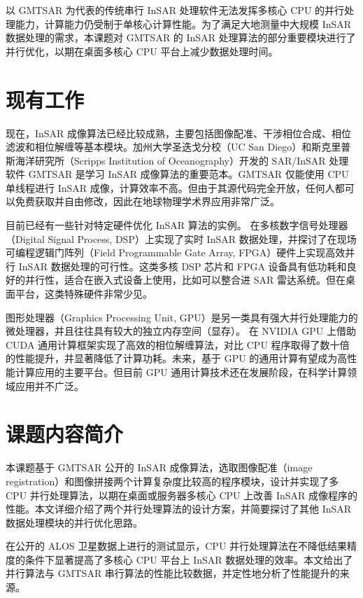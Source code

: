 以 GMTSAR 为代表的传统串行 InSAR 处理软件无法发挥多核心 CPU 的并行处理能力，计算能力仍受制于单核心计算性能。为了满足大地测量中大规模 InSAR 数据处理的需求，本课题对 GMTSAR 的 InSAR 处理算法的部分重要模块进行了并行优化，以期在桌面多核心 CPU 平台上减少数据处理时间。

\section{现有工作}

现在，InSAR 成像算法已经比较成熟，主要包括图像配准、干涉相位合成、相位滤波和相位解缠等基本模块。加州大学圣迭戈分校（UC San Diego）和斯克里普斯海洋研究所（Scripps Institution of Oceanography）开发的 SAR/InSAR 处理软件 GMTSAR 是学习 InSAR 成像算法的重要范本。GMTSAR 仅能使用 CPU 单线程进行 InSAR 成像，计算效率不高。但由于其源代码完全开放，任何人都可以免费获取并自由修改，因此在地球物理学术界应用非常广泛。

目前已经有一些针对特定硬件优化 InSAR 算法的实例。\citet{shayu2014} 在多核数字信号处理器（Digital Signal Process, DSP）上实现了实时 InSAR 数据处理，并探讨了在现场可编程逻辑门阵列（Field Programmable Gate Array, FPGA）硬件上实现高效并行 InSAR 数据处理的可行性。这类多核 DSP 芯片和 FPGA 设备具有低功耗和良好的并行性，适合在嵌入式设备上使用，比如可以整合进 SAR 雷达系统。但在桌面平台，这类特殊硬件非常少见。

图形处理器（Graphics Processing Unit, GPU）是另一类具有强大并行处理能力的微处理器，并且往往具有较大的独立内存空间（显存）。\citet{reza2015accelerating} 在 NVIDIA GPU 上借助 CUDA 通用计算框架实现了高效的相位解缠算法，对比 CPU 程序取得了数十倍的性能提升，并显著降低了计算功耗。未来，基于 GPU 的通用计算有望成为高性能计算应用的主要平台。但目前 GPU 通用计算技术还在发展阶段，在科学计算领域应用并不广泛。

\section{课题内容简介}

本课题基于 GMTSAR 公开的 InSAR 成像算法，选取图像配准（image registration）和图像拼接两个计算复杂度比较高的程序模块，设计并实现了多 CPU 并行处理算法，以期在桌面或服务器多核心 CPU 上改善 InSAR 成像程序的性能。本文详细介绍了两个并行处理算法的设计方案，并简要探讨了其他 InSAR 数据处理模块的并行优化思路。

在公开的 ALOS 卫星数据上进行的测试显示，CPU 并行处理算法在不降低结果精度的条件下显著提高了多核心 CPU 平台上 InSAR 数据处理的效率。本文给出了并行算法与 GMTSAR 串行算法的性能比较数据，并定性地分析了性能提升的来源。

